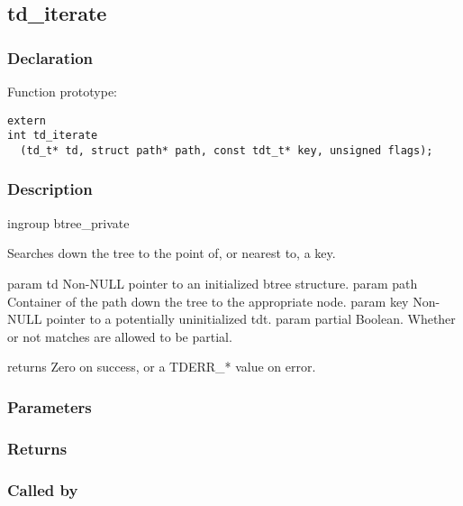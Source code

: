 
\newpage
\subsection{td\_iterate}
\subsubsection{Declaration} Function prototype:

\begin{verbatim}
extern
int td_iterate
  (td_t* td, struct path* path, const tdt_t* key, unsigned flags);
\end{verbatim}

\subsubsection{Description}


 ingroup btree\_private

 Searches down the tree to the point of, or nearest to, a key.

 param td Non-NULL pointer to an initialized btree structure.
 param path Container of the path down the tree to the appropriate node.
 param key Non-NULL pointer to a potentially uninitialized tdt.
 param partial Boolean. Whether or not matches are allowed to be partial.

 returns Zero on success, or a TDERR\_* value on error.
 

\subsubsection{Parameters}
\subsubsection{Returns}
\subsubsection{Called by}
